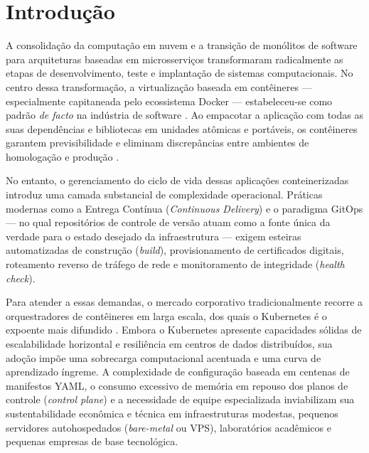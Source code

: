 
\section{Introdução}
\label{sec:introducao}

A consolidação da computação em nuvem e a transição de monólitos de software para arquiteturas baseadas em microsserviços transformaram radicalmente as etapas de desenvolvimento, teste e implantação de sistemas computacionais. No centro dessa transformação, a virtualização baseada em contêineres --- especialmente capitaneada pelo ecossistema Docker --- estabeleceu-se como padrão \textit{de facto} na indústria de software \cite{merkel2014}. Ao empacotar a aplicação com todas as suas dependências e bibliotecas em unidades atômicas e portáveis, os contêineres garantem previsibilidade e eliminam discrepâncias entre ambientes de homologação e produção \cite{combes2016}.

No entanto, o gerenciamento do ciclo de vida dessas aplicações conteinerizadas introduz uma camada substancial de complexidade operacional. Práticas modernas como a Entrega Contínua (\textit{Continuous Delivery}) \cite{humble2010} e o paradigma GitOps --- no qual repositórios de controle de versão atuam como a fonte única da verdade para o estado desejado da infraestrutura --- exigem esteiras automatizadas de construção (\textit{build}), provisionamento de certificados digitais, roteamento reverso de tráfego de rede e monitoramento de integridade (\textit{health check}).

Para atender a essas demandas, o mercado corporativo tradicionalmente recorre a orquestradores de contêineres em larga escala, dos quais o Kubernetes é o expoente mais difundido \cite{burns2016}. Embora o Kubernetes apresente capacidades sólidas de escalabilidade horizontal e resiliência em centros de dados distribuídos, sua adoção impõe uma sobrecarga computacional acentuada e uma curva de aprendizado íngreme. A complexidade de configuração baseada em centenas de manifestos YAML, o consumo excessivo de memória em repouso dos planos de controle (\textit{control plane}) e a necessidade de equipe especializada inviabilizam sua sustentabilidade econômica e técnica em infraestruturas modestas, pequenos servidores autohospedados (\textit{bare-metal} ou VPS), laboratórios acadêmicos e pequenas empresas de base tecnológica.

